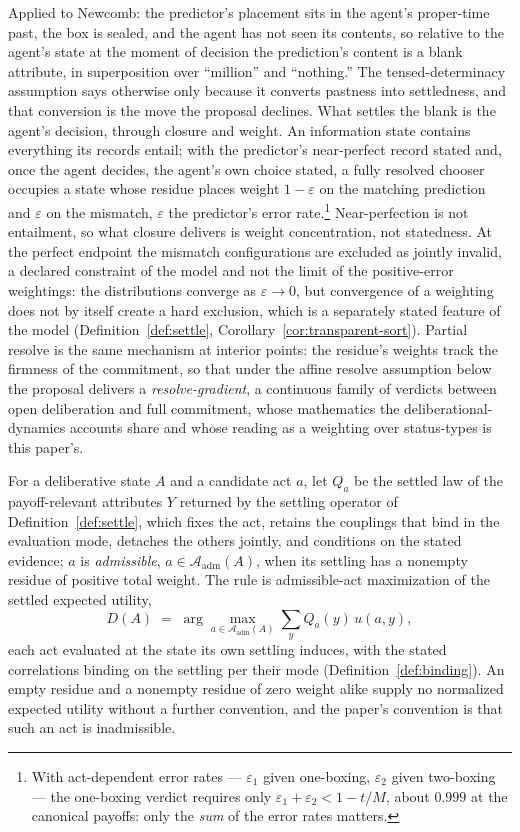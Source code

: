 Applied to Newcomb: the predictor's placement sits in the agent's proper-time past, the box is sealed, and the agent has not seen its contents, so relative to the agent's state at the moment of decision the prediction's content is a blank attribute, in superposition over ``million'' and ``nothing.'' The tensed-determinacy assumption says otherwise only because it converts pastness into settledness, and that conversion is the move the proposal declines. What settles the blank is the agent's decision, through closure and weight. An information state contains everything its records entail; with the predictor's near-perfect record stated and, once the agent decides, the agent's own choice stated, a fully resolved chooser occupies a state whose residue places weight $1 - \varepsilon$ on the matching prediction and $\varepsilon$ on the mismatch, $\varepsilon$ the predictor's error rate.\footnote{With act-dependent error rates --- $\varepsilon_1$ given one-boxing, $\varepsilon_2$ given two-boxing --- the one-boxing verdict requires only $\varepsilon_1 + \varepsilon_2 < 1 - t/M$, about $0.999$ at the canonical payoffs: only the \emph{sum} of the error rates matters.} Near-perfection is not entailment, so what closure delivers is weight concentration, not statedness. At the perfect endpoint the mismatch configurations are excluded as jointly invalid, a declared constraint of the model and not the limit of the positive-error weightings: the distributions converge as $\varepsilon \to 0$, but convergence of a weighting does not by itself create a hard exclusion, which is a separately stated feature of the model (Definition~\ref{def:settle}, Corollary~\ref{cor:transparent-sort}). Partial resolve is the same mechanism at interior points: the residue's weights track the firmness of the commitment, so that under the affine resolve assumption below the proposal delivers a \emph{resolve-gradient}, a continuous family of verdicts between open deliberation and full commitment, whose mathematics the deliberational-dynamics accounts share and whose reading as a weighting over status-types is this paper's.

\begin{principle}\label{prin:rule}
For a deliberative state $A$ and a candidate act $a$, let $Q_a$ be the settled law of the payoff-relevant attributes $Y$ returned by the settling operator of Definition~\ref{def:settle}, which fixes the act, retains the couplings that bind in the evaluation mode, detaches the others jointly, and conditions on the stated evidence; $a$ is \emph{admissible}, $a \in \mathcal{A}_{\mathrm{adm}}(A)$, when its settling has a nonempty residue of positive total weight. The rule is admissible-act maximization of the settled expected utility,
\[
D(A) \;=\; \arg\max_{a \in \mathcal{A}_{\mathrm{adm}}(A)} \sum_{y} Q_a(y)\, u(a, y),
\]
each act evaluated at the state its own settling induces, with the stated correlations binding on the settling per their mode (Definition~\ref{def:binding}). An empty residue and a nonempty residue of zero weight alike supply no normalized expected utility without a further convention, and the paper's convention is that such an act is inadmissible.
\end{principle}

